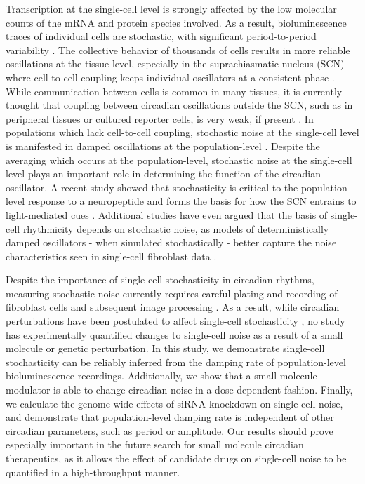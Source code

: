 \documentclass[11pt, letterpaper]{article}
\begin{document}
Transcription at the single-cell level is strongly affected by the low molecular counts of the mRNA and protein species involved. 
As a result, bioluminescence traces of individual cells are stochastic, with significant period-to-period variability \cite{Welsh2004}. 
The collective behavior of thousands of cells results in more reliable oscillations at the tissue-level, especially in the suprachiasmatic nucleus (SCN) where cell-to-cell coupling keeps individual oscillators at a consistent phase \cite{Herzog2004}. 
While communication between cells is common in many tissues, it is currently thought that coupling between circadian oscillations outside the SCN, such as in peripheral tissues or cultured reporter cells, is very weak, if present \cite{Guenthner2014, Noguchi2013}.
In populations which lack cell-to-cell coupling, stochastic noise at the single-cell level is manifested in damped oscillations at the population-level \cite{Welsh2004}. 
Despite the averaging which occurs at the population-level, stochastic noise at the single-cell level plays an important role in determining the function of the circadian oscillator.
A recent study showed that stochasticity is critical to the population-level response to a neuropeptide and forms the basis for how the SCN entrains to light-mediated cues \cite{An2013}.
Additional studies have even argued that the basis of single-cell rhythmicity depends on stochastic noise, as models of deterministically damped oscillators - when simulated stochastically - better capture the noise characteristics seen in single-cell fibroblast data \cite{Westermark2009}.

Despite the importance of single-cell stochasticity in circadian rhythms, measuring stochastic noise currently requires careful plating and recording of fibroblast cells and subsequent image processing \cite{Leise2012}. 
As a result, while circadian perturbations have been postulated to affect single-cell stochasticity \cite{Rougemont2007}, no study has experimentally quantified changes to single-cell noise as a result of a small molecule or genetic perturbation.
In this study, we demonstrate single-cell stochasticity can be reliably inferred from the damping rate of population-level bioluminescence recordings.
Additionally, we show that a small-molecule modulator is able to change circadian noise in a dose-dependent fashion. 
Finally, we calculate the genome-wide effects of siRNA knockdown on single-cell noise, and demonstrate that population-level damping rate is independent of other circadian parameters, such as period or amplitude.
Our results should prove especially important in the future search for small molecule circadian therapeutics, as it allows the effect of candidate drugs on single-cell noise to be quantified in a high-throughput manner.
\end{document}
